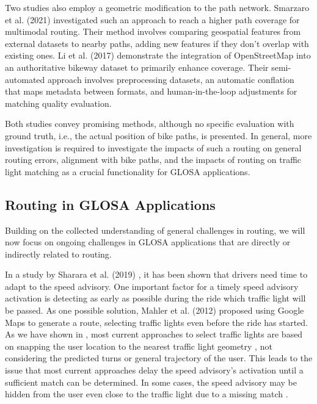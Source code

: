 Two studies also employ a geometric modification to the path network. Smarzaro et al. (2021) \cite{smarzaro_creation_2021} investigated such an approach to reach a higher path coverage for multimodal routing. Their method involves comparing geospatial features from external datasets to nearby paths, adding new features if they don't overlap with existing ones. Li et al. (2017) \cite{li_optimized_2017} demonstrate the integration of OpenStreetMap into an authoritative bikeway dataset to primarily enhance coverage. Their semi-automated approach involves preprocessing datasets, an automatic conflation that maps metadata between formats, and human-in-the-loop adjustments for matching quality evaluation. 

Both studies convey promising methods, although no specific evaluation with ground truth, i.e., the actual position of bike paths, is presented. In general, more investigation is required to investigate the impacts of such a routing on general routing errors, alignment with bike paths, and the impacts of routing on traffic light matching as a crucial functionality for GLOSA applications.

\subsection{Routing in GLOSA Applications}

Building on the collected understanding of general challenges in routing, we will now focus on ongoing challenges in GLOSA applications that are directly or indirectly related to routing.

In a study by Sharara et al. (2019) \cite{sharara_impact_2019}, it has been shown that drivers need time to adapt to the speed advisory. One important factor for a timely speed advisory activation is detecting as early as possible during the ride which traffic light will be passed. As one possible solution, Mahler et al. (2012) \cite{mahler_reducing_2012} proposed using Google Maps to generate a route, selecting traffic lights even before the ride has started. As we have shown in , most current approaches to select traffic lights are based on snapping the user location to the nearest traffic light geometry \cite{katsaros_performance_2011, bernais_design_2016, wilson_driver_2017, stahlmann_exploring_2018, bhattacharyya_assessing_2022}, not considering the predicted turns or general trajectory of the user. This leads to the issue that most current approaches delay the speed advisory's activation until a sufficient match can be determined. In some cases, the speed advisory may be hidden from the user even close to the traffic light due to a missing match \cite{wilson_driver_2017, stahlmann_exploring_2018}.

